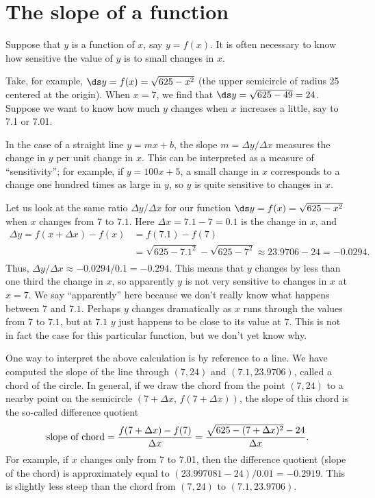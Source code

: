 \section{The slope of a function}{}{}
\label{sec:slope of a function}

Suppose that $y$ is a function of $x$, say $y = f(x)$.
It is often necessary to know how sensitive the value of $y$
is to small changes in $x$.

\begin{example}
Take, for example, $\ds y=f(x)=\sqrt{625-x^2}$ (the upper semicircle of radius
25 centered at the origin).  When $x=7$, we find that $\ds y=\sqrt{625-49}=24$.
Suppose we want to know how much $y$ changes when $x$ increases a little,
say to 7.1 or 7.01.

In the case of a straight line $y=mx+b$, the slope $m=\Delta y/\Delta
x$ measures the change in $y$ per unit change in $x$. This can be
interpreted as a measure of ``sensitivity''; for example, if
$y=100x+5$, a small change in $x$ corresponds to a change one hundred
times as large in $y$, so $y$ is quite sensitive to changes in $x$.

Let us look at the
same ratio $\Delta y/\Delta x$ for our function
$\ds y=f(x)=\sqrt{625-x^2}$ when $x$ changes from 7 to $7.1$.  Here $\Delta
x=7.1-7=0.1$ is the change in $x$, and
\begin{align*}
 \Delta y =f(x+\Delta x)-f(x)&=f(7.1)-f(7) \\
          &=\sqrt{625-7.1^2}-\sqrt{625-7^2}\approx 23.9706-24=-0.0294. \\
\end{align*}
Thus, $\Delta y/\Delta x\approx -0.0294/0.1=-0.294$. This means that $y$
changes by less than one third the change in $x$, so apparently $y$ is
not very sensitive to changes in $x$ at $x=7$. We say ``apparently''
here because we don't really know what happens between 7 and
$7.1$. Perhaps $y$ changes dramatically as $x$ runs through the values
from 7 to $7.1$, but at $7.1$ $y$ just happens to be close to its
value at $7$. This is not in fact the case for this particular
function, but we don't yet know why.
\end{example}

One way to interpret the above calculation is by reference to a line.
We have computed the slope of the line through $(7,24)$ and
$(7.1,23.9706)$, called a {\dfont chord} of the circle.
In general, if we draw the chord from the point $(7,24)$ to a nearby
point on the semicircle $(7+\Delta x,\,f(7+\Delta x))$, the slope of this
chord is the so-called {\dfont difference quotient}
$$
\hbox{slope~of~chord}={f(7+\Delta x)-f(7)\over \Delta x}=
{\sqrt{625-(7+\Delta x)^2}-24\over \Delta x}.
$$ For example, if $x$ changes only from 7 to 7.01, then the
difference quotient (slope of the chord) is approximately equal to
$(23.997081-24)/0.01=-0.2919$.  This is slightly less steep than the
chord from $(7,24)$ to $(7.1,23.9706)$.

